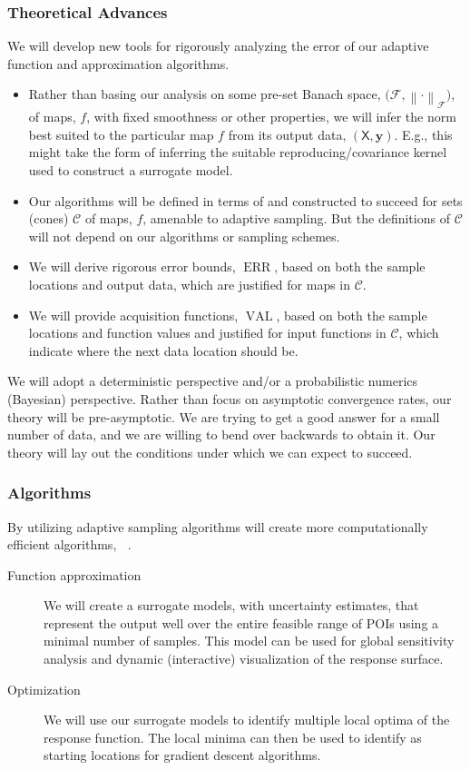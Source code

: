 \documentclass[11pt]{NSFamsart}
\DeclareMathOperator{\QOI}{QOI} %
\DeclareMathOperator{\APP}{\widehat{\QOI}}
\DeclareMathOperator{\ERR}{ERR}
\DeclareMathOperator{\VAL}{VAL}
\newcommand{\mX}{\mathsf{X}}
\newcommand{\by}{{\boldsymbol{y}}}
\newcommand{\calc}{{\mathcal{C}}}
\newcommand{\calf}{{\mathcal{F}}}
\newcommand{\norm}[2][{}]{\ensuremath{\left \lVert #2 \right \rVert}_{#1}}
\begin{document}
\subsubsection{Theoretical Advances}
We will develop new tools for rigorously analyzing the error of our adaptive function and approximation algorithms.  
\begin{itemize}
\item Rather than basing our analysis on some pre-set Banach space, $\bigl(\calf,\norm[\calf]{\cdot}\bigr)$, of maps, $f$, with fixed smoothness or other properties, we will infer the norm best suited to the particular map $f$ from its output data, $(\mX,\by)$.  E.g., this might take the form of inferring the suitable reproducing/covariance kernel used to construct a surrogate model. 

\item Our algorithms will be defined in terms of and constructed to succeed for sets (cones) $\calc$ of maps, $f$, amenable to adaptive sampling. But the definitions of $\calc$ will not depend on our algorithms or sampling schemes.

\item We will derive rigorous error bounds, $\ERR$, based on both the sample locations and output data, which are justified for maps in $\calc$. 

\item We will provide  acquisition functions, $\VAL$, based on both the sample locations and function values and justified for input functions in $\calc$, which indicate where the next data location should be.
\end{itemize}
We will adopt a deterministic perspective and/or a probabilistic numerics (Bayesian) perspective.  Rather than focus on asymptotic convergence rates, our theory will be pre-asymptotic.  We are trying to get a good answer for a small number of data, and we are willing to bend over backwards to obtain it.  Our theory will lay out the conditions under which we can expect to succeed.

\subsubsection{Algorithms}
By utilizing adaptive sampling algorithms will create more computationally efficient algorithms, $\APP$.
\renewcommand{\descriptionlabel}[1]{\hspace{\labelsep}\textit{#1}.}
\begin{description}
\item[Function approximation] We will create a surrogate models, with uncertainty estimates, that represent the output well over the entire feasible range of POIs using a minimal number of samples.  This model can be used for global sensitivity analysis and dynamic (interactive) visualization of the response surface. 
\item[Optimization] We will use our surrogate models to identify multiple local optima of the response function.  The local minima can then be used to identify as starting locations for gradient descent algorithms.
\end{description}
\end{document}
